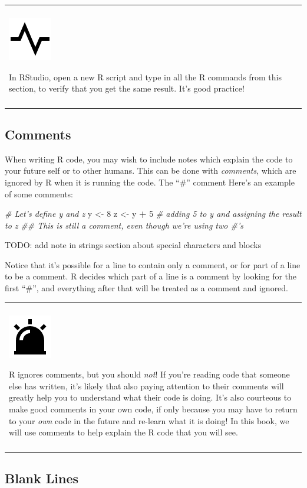 \documentclass[
]{book}
\newenvironment{Shaded}{\begin{snugshade}}{\end{snugshade}}
\newcommand{\CommentTok}[1]{\textcolor[rgb]{0.56,0.35,0.01}{\textit{#1}}}
\newcommand{\DecValTok}[1]{\textcolor[rgb]{0.00,0.00,0.81}{#1}}
\newcommand{\NormalTok}[1]{#1}
\newcommand{\OperatorTok}[1]{\textcolor[rgb]{0.81,0.36,0.00}{\textbf{#1}}}
\newcommand{\StringTok}[1]{\textcolor[rgb]{0.31,0.60,0.02}{#1}}
\newenvironment{progress}
{
  \begin{center}
  \begin{tabular}{|>{\columncolor{progress}}p{0.9\textwidth}|}
  \hline\\
  \includegraphics[scale=0.1]{src/images/pulse-line.png}
}
{\\\\\hline
  \end{tabular}
  \end{center}
}
\newenvironment{caution}
{
  \begin{center}
  \begin{tabular}{|>{\columncolor{caution}}p{0.9\textwidth}|}
  \hline\\
  \includegraphics[scale=0.1]{src/images/alarm-warning-fill.png}
}
{\\\\\hline
  \end{tabular}
  \end{center}
}
\begin{document}
\begin{progress}
In RStudio, open a new R script and type in all the R commands from this
section, to verify that you get the same result. It's good practice!
\end{progress}

\hypertarget{comments}{%
\subsection{Comments}\label{comments}}

When writing R code, you may wish to include notes which explain the code to your future self or to other humans.
This can be done with \emph{comments}, which are ignored by R when it is running the code.
The ``\#'' comment
Here's an example of some comments:

\begin{Shaded}
\begin{Highlighting}[]
\CommentTok{# Let's define y and z}
\NormalTok{y <-}\StringTok{ }\DecValTok{8}
\NormalTok{z <-}\StringTok{ }\NormalTok{y }\OperatorTok{+}\StringTok{ }\DecValTok{5} \CommentTok{# adding 5 to y and assigning the result to z}
\CommentTok{## This is still a comment, even though we're using two #'s}
\end{Highlighting}
\end{Shaded}

TODO: add note in strings section about special characters and blocks

Notice that it's possible for a line to contain only a comment, or for part of a line to be a comment.
R decides which part of a line is a comment by looking for the first ``\#'', and everything after that will be treated as a comment and ignored.

\begin{caution}
R ignores comments, but you should \emph{not}! If you're reading code
that someone else has written, it's likely that also paying attention to
their comments will greatly help you to understand what their code is
doing. It's also courteous to make good comments in your own code, if
only because you may have to return to your \emph{own} code in the
future and re-learn what it is doing! In this book, we will use comments
to help explain the R code that you will see.
\end{caution}

\hypertarget{blank-lines}{%
\subsection{Blank Lines}\label{blank-lines}}
\end{document}
